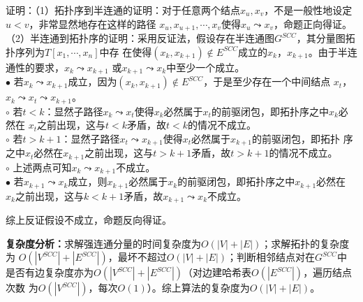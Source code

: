 \begin{solution}
    证明：（1）拓扑序到半连通的证明：对于任意两个结点$x_u,x_v$，不是一般性地设定$u<v$，非常显然地存在这样的路径
    $x_u,x_{u+1},\cdots,x_v$使得$x_u\leadsto x_v$，命题正向得证。\\
    （2）半连通到拓扑序的证明：采用反证法，假设存在半连通图$G^{SCC}$，其分量图拓扑序列为$T[x_1,\cdots,x_n]$中存
    在使得$(x_k,x_{k+1}) \notin E^{SCC}$成立的$x_k$，$x_{k+1}$。由于半连通性的要求，$x_k \leadsto x_{k+1}$
    或$x_{k+1} \leadsto x_{k}$中至少一个成立。\\
    $\bullet$ 若$x_k \leadsto x_{k+1}$成立，因为$(x_k,x_{k+1}) \notin E^{SCC}$，于是至少存在一个中间结点
    $x_t$，$x_k \leadsto x_t \leadsto x_{k+1}$。\\
    \qquad $\circ$ 若$t<k$：显然子路径$x_k \leadsto x_t$使得$x_k$必然属于$x_t$的前驱闭包，即拓扑序之中$x_k$必然在
    $x_t$之前出现，这与$t<k$矛盾，故$t<k$的情况不成立。\\
    \qquad $\circ$ 若$t>k+1$：显然子路径$x_{t} \leadsto x_{k+1}$使得$x_t$必然属于$x_{k+1}$的前驱闭包，即拓扑
    序之中$x_t$必然在$x_{k+1}$之前出现，这与$t>k+1$矛盾，故$t>k+1$的情况不成立。\\
    \qquad $\circ$ 上述两点可知$x_k \leadsto x_{k+1}$不成立。\\
    $\bullet$ 若$x_{k+1} \leadsto x_k$成立，则$x_{k+1}$必然属于$x_{k}$的前驱闭包，即拓扑序之中$x_{k+1}$必然在
    $x_{k}$之前出现，这与$k<k+1$矛盾，故$x_{k+1} \leadsto x_k$不成立。

    综上反证假设不成立，命题反向得证。

    \textbf{复杂度分析：}求解强连通分量的时间复杂度为$O(|V|+|E|)$；求解拓扑的复杂度为
    $O(|V^{SCC}|+|E^{SCC}|)$，最坏不超过$O(|V|+|E|)$；判断相邻结点对在$G^{SCC}$中
    是否有边复杂度亦为$O(|V^{SCC}|+|E^{SCC}|)$（对边建哈希表$O(|E^{SCC}|)$，遍历结点次数
    为$O(|V^{SCC}|)$，每次$O(1)$）。综上算法的复杂度为$O(|V|+|E|)$。
\end{solution} 
